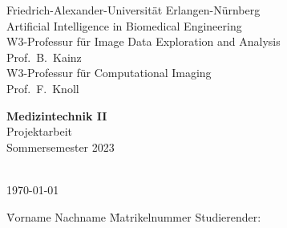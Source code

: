 

\begin{titlepage}

\begin{center}
Friedrich-Alexander-Universit\"at Erlangen-N\"urnberg\\
Artificial Intelligence in Biomedical Engineering\\
W3-Professur für Image Data Exploration and Analysis\\
Prof.\ B.\ Kainz\\
W3-Professur für Computational Imaging\\
Prof.\ F.\ Knoll\\


\vspace*{9em}

{\huge \textbf{\textsf{Medizintechnik II}}}\\[.3em]
{Projektarbeit}\\[.3em]
{Sommersemester 2023}\\

\vspace*{9em}

{\huge \textbf{\textsf{\titel}}}\\[.7em]
{\today}
\end{center}

\vfill%
\begin{tabbing}
	\hspace*{5cm} \= Vorname Nachname \hspace*{4em} \= Matrikelnummer \kill
	Studierender:\> \erster \> \mnreins \\
\end{tabbing}

\end{titlepage}
